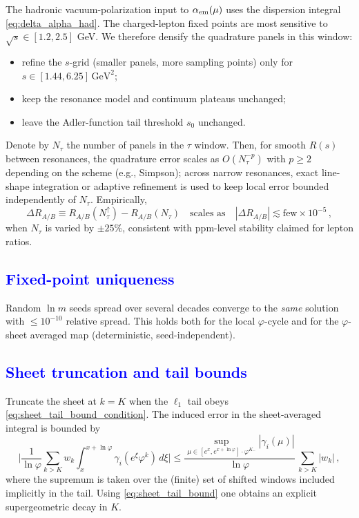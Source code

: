 \documentclass[%
amsmath,amssymb,
aps,
prb,
floatfix,showkeys
]{revtex4-2}
\newcommand{\modif}[1]{\textcolor{blue}{#1}}
\begin{document}
The hadronic vacuum-polarization input to $\alpha_{\rm em}(\mu)$ uses the dispersion integral \eqref{eq:delta_alpha_had}. The charged-lepton fixed points are most sensitive to $\sqrt{s}\in[1.2,2.5]$ GeV. We therefore densify the quadrature panels in this window:
\begin{itemize}
  \item refine the $s$-grid (smaller panels, more sampling points) only for $s\in[1.44,6.25]\,\mathrm{GeV}^2$;
  \item keep the resonance model and continuum plateaus unchanged;
  \item leave the Adler-function tail threshold $s_0$ unchanged.
\end{itemize}
Denote by $N_{\tau}$ the number of panels in the $\tau$ window. Then, for smooth $R(s)$ between resonances, the quadrature error scales as $O(N_{\tau}^{-p})$ with $p\ge 2$ depending on the scheme (e.g., Simpson); across narrow resonances, exact line-shape integration or adaptive refinement is used to keep local error bounded independently of $N_{\tau}$. Empirically,
\begin{equation}
  \Delta R_{A/B} \equiv R_{A/B}(N_{\tau}^\uparrow)-R_{A/B}(N_{\tau})
  \quad\text{scales as}\quad |\Delta R_{A/B}| \lesssim \mathrm{few}\times10^{-5}\,,
\end{equation}
when $N_{\tau}$ is varied by $\pm 25\%$, consistent with ppm-level stability claimed for lepton ratios.

{\modif{\subsection{Fixed-point uniqueness}
\label{subsec:error_fixed_point}}}

Random $\ln m$ seeds spread over several decades converge to the \emph{same} solution with $\le 10^{-10}$ relative spread. This holds both for the local $\varphi$-cycle and for the $\varphi$-sheet averaged map (deterministic, seed-independent).

{\modif{\subsection{Sheet truncation and tail bounds}
\label{subsec:error_sheet}}}

Truncate the sheet at $k=K$ when the $\ell_1$ tail obeys \eqref{eq:sheet_tail_bound_condition}. The induced error in the sheet-averaged integral is bounded by
\begin{equation}
  \biggl|\frac{1}{\ln\varphi}\sum_{k>K}\! w_k \int_x^{x+\ln\varphi}\gamma_i(e^\xi \varphi^{k})\,d\xi \biggr|
  \le \frac{\sup_{\mu\in[e^x,e^{x+\ln\varphi}]\cdot\varphi^{K..}}|\gamma_i(\mu)|}{\ln\varphi}\,\sum_{k>K}|w_k|\,,
  \label{eq:sheet_trunc_error}
\end{equation}
where the supremum is taken over the (finite) set of shifted windows included implicitly in the tail. Using \eqref{eq:sheet_tail_bound} one obtains an explicit supergeometric decay in $K$.
\end{document}
